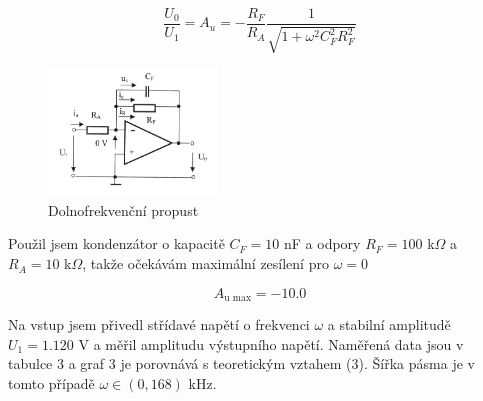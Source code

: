 \documentclass[a4paper,11pt]{article}
\begin{document}
\begin{equation}
\frac{U_0}{U_1} = A_u = -\frac{R_F}{R_A} \frac{1}{ \sqrt{1 + \omega^2 C_F^2 R_F^2} } 
\end{equation}

\begin{figure}[h]
    \centering
    \includegraphics[width=0.4\textwidth]{propust.jpg}
    \caption{Dolnofrekvenční propust}
\end{figure}

Použil jsem kondenzátor o kapacitě $ C_F = 10  $ nF a odpory $ R_F = 100 $ k$\Omega$ a $ R_A = 10 $ k$ \Omega $, takže očekávám maximální zesílení pro $ \omega = 0 $ 

\begin{equation}
A_{\text{u max}} = - 10.0
\end{equation}


Na vstup jsem přivedl střídavé napětí o frekvenci $ \omega $ a stabilní amplitudě $ U_1 = 1.120 $ V a měřil amplitudu výstupního napětí. Naměřená data jsou v tabulce 3 a graf 3 je porovnává s teoretickým vztahem (3). Šířka pásma je v tomto případě $ \omega \in (0, 168) $ kHz.
\end{document}
